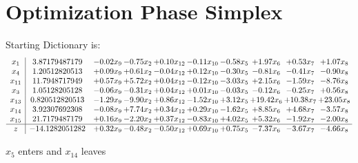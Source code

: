\documentclass[9pt]{article}
\begin{document}
\section{Optimization Phase Simplex}
Starting Dictionary is:
\[\begin{array}{c| c c@{\hskip 2pt} c@{\hskip 2pt} c@{\hskip 2pt} c@{\hskip 2pt} c@{\hskip 2pt} c@{\hskip 2pt} c@{\hskip 2pt} c@{\hskip 2pt} }
 x_{1}   &  3.87179487179 & -0.02 x_{9} & -0.75 x_{2} & +  0.10 x_{12} & -0.11 x_{10} & -0.58 x_{5} & +  1.97 x_{6} & +  0.53 x_{7} & +  1.07 x_{8}\\
 x_{4}   &  1.20512820513 & +  0.09 x_{9} & +  0.61 x_{2} & -0.04 x_{12} & +  0.12 x_{10} & -0.30 x_{5} & -0.81 x_{6} & -0.41 x_{7} & -0.90 x_{8}\\
 x_{11}   &  11.7948717949 & +  0.57 x_{9} & +  5.72 x_{2} & +  0.04 x_{12} & -0.12 x_{10} & -3.03 x_{5} & +  2.15 x_{6} & -1.59 x_{7} & -8.76 x_{8}\\
 x_{3}   &  1.05128205128 & -0.06 x_{9} & -0.31 x_{2} & +  0.04 x_{12} & +  0.01 x_{10} & -0.03 x_{5} & -0.12 x_{6} & -0.25 x_{7} & +  0.56 x_{8}\\
 x_{13}   &  0.820512820513 & -1.29 x_{9} & -9.90 x_{2} & +  0.86 x_{12} & -1.52 x_{10} & +  3.12 x_{5} & + 19.42 x_{6} & + 10.38 x_{7} & + 23.05 x_{8}\\
 x_{14}   &  3.92307692308 & -0.08 x_{9} & +  7.74 x_{2} & +  0.34 x_{12} & +  0.29 x_{10} & -1.62 x_{5} & +  8.85 x_{6} & +  4.68 x_{7} & -3.57 x_{8}\\
 x_{15}   &  21.7179487179 & +  0.16 x_{9} & -2.20 x_{2} & +  0.37 x_{12} & -0.83 x_{10} & +  4.02 x_{5} & +  5.32 x_{6} & -1.92 x_{7} & -2.00 x_{8}\\
\hline
z    &  -14.1282051282 & +  0.32 x_{9} & -0.48 x_{2} & -0.50 x_{12} & +  0.69 x_{10} & +  0.75 x_{5} & -7.37 x_{6} & -3.67 x_{7} & -4.66 x_{8}\\
\end{array}\]


 $ x_{5} $ enters and $ x_{14} $ leaves 
\end{document}
